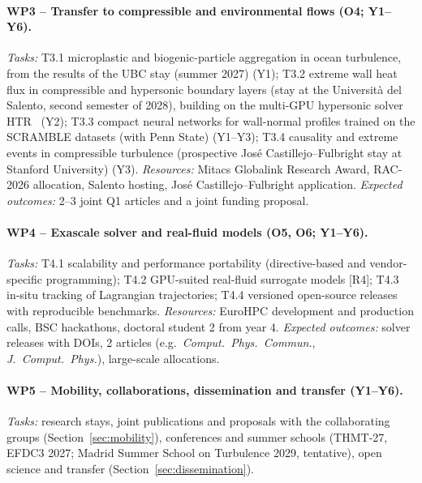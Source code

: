 \documentclass[11pt]{article}
\begin{document}
\paragraph{WP3 -- Transfer to compressible and environmental flows (O4; Y1--Y6).}
\emph{Tasks:} T3.1 microplastic and biogenic-particle aggregation in ocean turbulence,
from the results of the UBC stay (summer 2027) (Y1); T3.2 extreme wall heat flux in
compressible and hypersonic boundary layers (stay at the Universit\`a del Salento, second
semester of 2028), building on the multi-GPU hypersonic solver HTR~\cite{DiRenzo2020}
(Y2); T3.3 compact neural networks for wall-normal profiles trained on the SCRAMBLE
datasets (with Penn State) (Y1--Y3); T3.4 causality and extreme events in compressible
turbulence (prospective Jos\'e Castillejo--Fulbright stay at Stanford University) (Y3).
\emph{Resources:} Mitacs Globalink Research Award, RAC-2026 allocation, Salento hosting,
Jos\'e Castillejo--Fulbright application.
\emph{Expected outcomes:} 2--3 joint Q1 articles and a joint funding proposal.

\paragraph{WP4 -- Exascale solver and real-fluid models (O5, O6; Y1--Y6).}
\emph{Tasks:} T4.1 scalability and performance portability (directive-based and
vendor-specific programming); T4.2 GPU-suited real-fluid surrogate models [R4]; T4.3
in-situ tracking of Lagrangian trajectories; T4.4 versioned open-source releases with
reproducible benchmarks.
\emph{Resources:} EuroHPC development and production calls, BSC hackathons, doctoral
student 2 from year 4.
\emph{Expected outcomes:} solver releases with DOIs, 2 articles (e.g.\ \emph{Comput.\
Phys.\ Commun.}, \emph{J.\ Comput.\ Phys.}), large-scale allocations.

\paragraph{WP5 -- Mobility, collaborations, dissemination and transfer (Y1--Y6).}
\emph{Tasks:} research stays, joint publications and proposals with the collaborating
groups (Section~\ref{sec:mobility}), conferences and summer schools (THMT-27, EFDC3 2027;
Madrid Summer School on Turbulence 2029, tentative), open science and transfer
(Section~\ref{sec:dissemination}).
\end{document}
